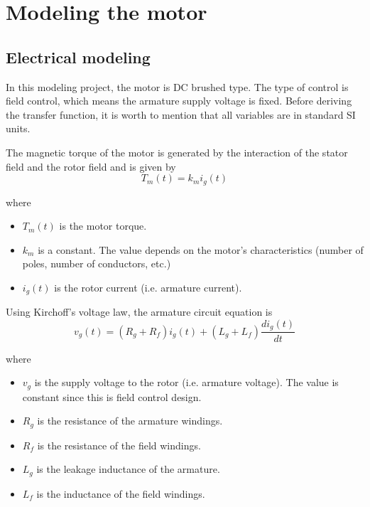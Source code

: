 \chapter{Modeling the motor}

\section{Electrical modeling}

In this modeling project, the motor is DC brushed type. The type of control is field control, which means the armature supply voltage is fixed. Before deriving the transfer function, it is worth to mention that all variables are in standard SI units.

The magnetic torque of the motor is generated by the interaction of the stator field and the rotor field and is given by
\begin{equation}\label{e1}
	T_m(t) = k_mi_g(t)
\end{equation}

where
\begin{itemize}
	\item $ T_m(t) $ is the motor torque.
	\item $ k_m $ is a constant. The value depends on the motor's characteristics (number of poles, number of conductors, etc.)
	\item $ i_g(t) $ is the rotor current (i.e. armature current).
\end{itemize}

%

%

Using Kirchoff's voltage law, the armature circuit equation is
\begin{equation}\label{e2}
v_g(t) = (R_g+R_f)i_g(t) + (L_g+L_f) \dfrac{di_g(t)}{dt}
\end{equation}

where
\begin{itemize}
	\item $ v_g $ is the supply voltage to the rotor (i.e. armature voltage). The value is constant since this is field control design.
	\item $ R_g $ is the resistance of the armature windings.
	\item $ R_f $ is the resistance of the field windings.
	\item $ L_g $ is the leakage inductance of the armature.
	\item $ L_f $ is the inductance of the field windings.
\end{itemize}

